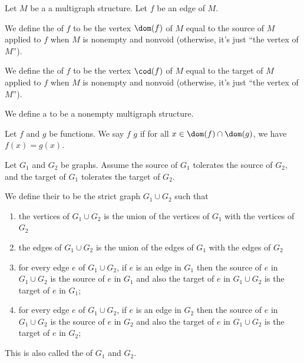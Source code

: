 \begin{definition}
Let $M$ be a a multigraph structure.
Let $f$ be an edge of $M$.

We define the  of $f$ to be the vertex $\dom(f)$ of $M$
equal to the source of $M$ applied to $f$ when $M$ is nonempty and
nonvoid (otherwise, it's just ``the vertex of $M$'').

We define the  of $f$ to be the vertex $\cod(f)$ of $M$
equal to the target of $M$ applied to $f$ when $M$ is nonempty and
nonvoid (otherwise, it's just ``the vertex of $M$'').
\end{definition}

\begin{definition}
We define a  to be a nonempty multigraph structure.
\end{definition}

\begin{definition}
Let $f$ and $g$ be functions.
We say $f$  $g$ if for all $x\in\dom(f)\cap\dom(g)$,
we have $f(x)=g(x)$.
\end{definition}

\begin{definition}
Let $G_{1}$ and $G_{2}$ be graphs. Assume the source of $G_{1}$
tolerates the source of $G_{2}$, and the target of $G_{1}$ tolerates
the target of $G_{2}$.

We define their  to be the strict graph $G_{1}\cup G_{2}$ such that
\begin{enumerate}
\item the vertices of $G_{1}\cup G_{2}$ is the union of the vertices
  of $G_{1}$ with the vertices of $G_{2}$
\item the edges of $G_{1}\cup G_{2}$ is the union of the edges
  of $G_{1}$ with the edges of $G_{2}$
\item for every edge $e$ of $G_{1}\cup G_{2}$, if $e$ is an edge in
  $G_{1}$ then the source of $e$ in $G_{1}\cup G_{2}$ is the source of
  $e$ in $G_{1}$ and also the target of $e$ in $G_{1}\cup G_{2}$ is the target of
  $e$ in $G_{1}$;
\item for every edge $e$ of $G_{1}\cup G_{2}$, if $e$ is an edge in
  $G_{2}$ then the source of $e$ in $G_{1}\cup G_{2}$ is the source of
  $e$ in $G_{2}$ and also the target of $e$ in $G_{1}\cup G_{2}$ is the target of
  $e$ in $G_{2}$;
\end{enumerate}
This is also called the  of $G_{1}$ and $G_{2}$.
\end{definition}